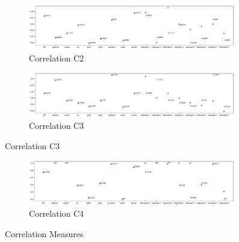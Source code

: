 \begin{figure}[h!]
    \centering
    \begin{subfigure}{0.496\textwidth}
        \includegraphics[width=0.99\textwidth]{figures/correlation-C2.png}
        \caption{Correlation C2}
        \label{fig:correlation-c2}
    \end{subfigure}
    \begin{subfigure}{0.496\textwidth}
        \includegraphics[width=0.99\textwidth]{figures/correlation-C3.png}
        \caption{Correlation C3}
        \label{fig:correlation-c3}
    \end{subfigure}
\end{figure}
\begin{figure}[h!]\ContinuedFloat
    \centering
    \begin{subfigure}{0.496\textwidth}
        \includegraphics[width=0.99\textwidth]{figures/correlation-C4.png}
        \caption{Correlation C4}
        \label{fig:correlation-c4}
    \end{subfigure}
    \caption{Correlation Measures}
    \label{fig:correlation}
\end{figure}

